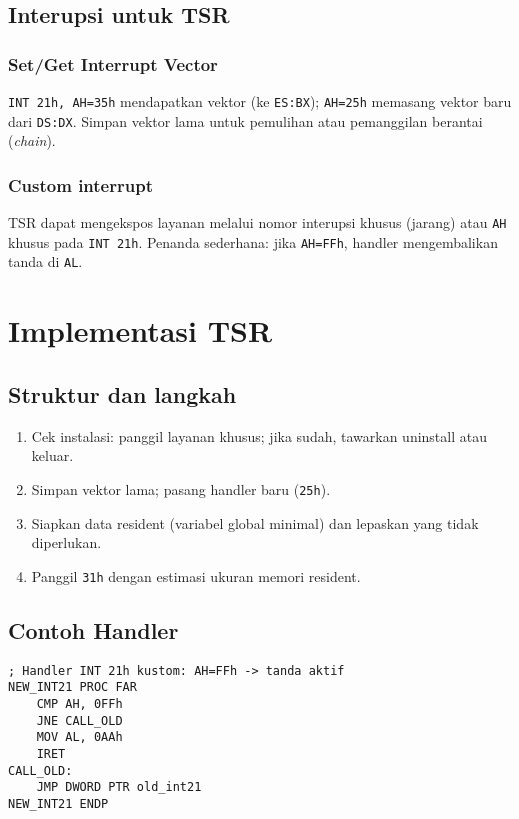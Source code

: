 \subsection{Interupsi untuk TSR}
\subsubsection{Set/Get Interrupt Vector}
\texttt{INT 21h, AH=35h} mendapatkan vektor (ke \texttt{ES:BX}); \texttt{AH=25h} memasang vektor baru dari \texttt{DS:DX}. Simpan vektor lama untuk pemulihan atau pemanggilan berantai (\textit{chain}).

\subsubsection{Custom interrupt}
TSR dapat mengekspos layanan melalui nomor interupsi khusus (jarang) atau \texttt{AH} khusus pada \texttt{INT 21h}. Penanda sederhana: jika \texttt{AH=FFh}, handler mengembalikan tanda di \texttt{AL}.

\section{Implementasi TSR}
\subsection{Struktur dan langkah}
\begin{enumerate}
  \item Cek instalasi: panggil layanan khusus; jika sudah, tawarkan uninstall atau keluar.
  \item Simpan vektor lama; pasang handler baru (\texttt{25h}).
  \item Siapkan data resident (variabel global minimal) dan lepaskan yang tidak diperlukan.
  \item Panggil \texttt{31h} dengan estimasi ukuran memori resident.
\end{enumerate}

\subsection{Contoh Handler}
\begin{verbatim}
; Handler INT 21h kustom: AH=FFh -> tanda aktif
NEW_INT21 PROC FAR
    CMP AH, 0FFh
    JNE CALL_OLD
    MOV AL, 0AAh
    IRET
CALL_OLD:
    JMP DWORD PTR old_int21
NEW_INT21 ENDP
\end{verbatim}

